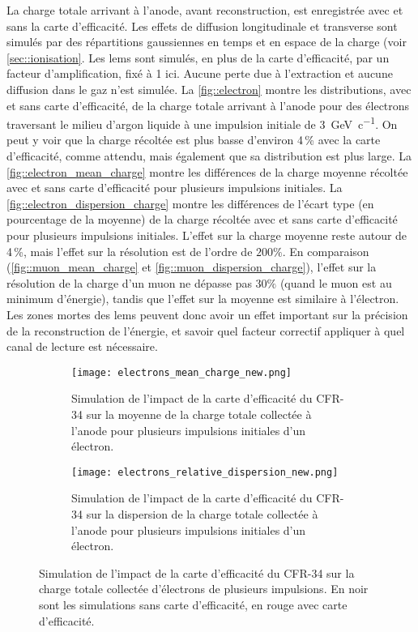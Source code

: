       La charge totale arrivant à l'anode, avant reconstruction, est enregistrée avec et sans la carte d'efficacité. Les effets de diffusion longitudinale et transverse sont simulés par des répartitions gaussiennes en temps et en espace de la charge (voir \autoref{sec::ionisation}. Les \glspl{lem} sont simulés, en plus de la carte d'efficacité, par un facteur d'amplification, fixé à 1 ici. Aucune perte due à l'extraction et aucune diffusion dans le gaz n'est simulée. La \autoref{fig::electron} montre les distributions, avec et sans carte d'efficacité, de la charge totale arrivant à l'anode pour des électrons traversant le milieu d'argon liquide à une impulsion initiale de \SI{3}{\giga\eV\per c}. On peut y voir que la charge récoltée est plus basse d'environ 4\,\% avec la carte d'efficacité, comme attendu, mais également que sa distribution est plus large. La \autoref{fig::electron_mean_charge} montre les différences de la charge moyenne récoltée avec et sans carte d'efficacité pour plusieurs impulsions initiales. La \autoref{fig::electron_dispersion_charge} montre les différences de l'écart type (en pourcentage de la moyenne) de la charge récoltée avec et sans carte d'efficacité pour plusieurs impulsions initiales. L'effet sur la charge moyenne reste autour de 4\,\%, mais l'effet sur la résolution est de l'ordre de $200\%$. En comparaison (\autoref{fig::muon_mean_charge} et \autoref{fig::muon_dispersion_charge}), l'effet sur la résolution de la charge d'un muon ne dépasse pas $30\%$ (quand le muon est au minimum d'énergie), tandis que l'effet sur la moyenne est similaire à l'électron. Les zones mortes des \glspl{lem} peuvent donc avoir un effet important sur la précision de la reconstruction de l'énergie, et savoir quel facteur correctif appliquer à quel canal de lecture est nécessaire.
            
      \begin{figure}[!htb]
        \begin{subfigure}[t]{0.48\textwidth}
          \centering
          \texttt{[image: electrons\_mean\_charge\_new.png]}
          \caption{\label{fig::electron_mean_charge}Simulation de l'impact de la carte d'efficacité du CFR-34 sur la moyenne de la charge totale collectée à l'anode pour plusieurs impulsions initiales d'un électron.}
        \end{subfigure}
        \hfill
        \begin{subfigure}[t]{0.48\textwidth}
          \centering
          \texttt{[image: electrons\_relative\_dispersion\_new.png]}
          \caption{\label{fig::electron_dispersion_charge}Simulation de l'impact de la carte d'efficacité du CFR-34 sur la dispersion de la charge totale collectée à l'anode pour plusieurs impulsions initiales d'un électron.}
        \end{subfigure}
        \caption[Simulation de l'impact de la carte d'efficacité du CFR-34 sur la charge totale collectée d'électrons de plusieurs impulsions]{Simulation de l'impact de la carte d'efficacité du CFR-34 sur la charge totale collectée d'électrons de plusieurs impulsions. En noir sont les simulations sans carte d'efficacité, en rouge avec carte d'efficacité.}
      \end{figure}
            
